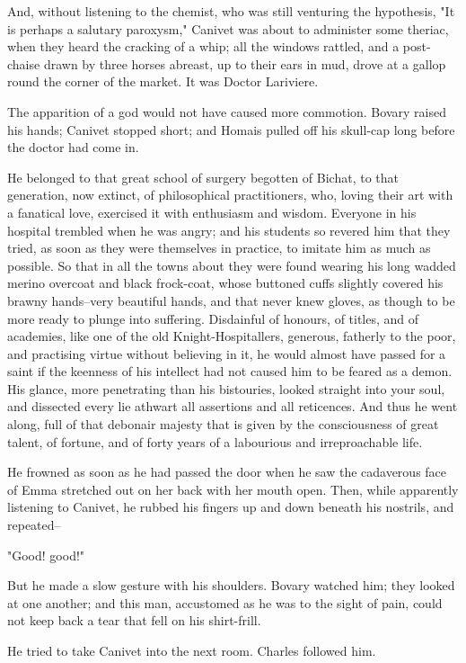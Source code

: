 \documentclass{tufte-book}
\begin{document}
And, without listening to the chemist, who was still venturing the
hypothesis, "It is perhaps a salutary paroxysm," Canivet was about to
administer some theriac, when they heard the cracking of a whip; all the
windows rattled, and a post-chaise drawn by three horses abreast, up to
their ears in mud, drove at a gallop round the corner of the market. It
was Doctor Lariviere.

The apparition of a god would not have caused more commotion. Bovary
raised his hands; Canivet stopped short; and Homais pulled off his
skull-cap long before the doctor had come in.

He belonged to that great school of surgery begotten of Bichat, to that
generation, now extinct, of philosophical practitioners, who, loving
their art with a fanatical love, exercised it with enthusiasm and
wisdom. Everyone in his hospital trembled when he was angry; and his
students so revered him that they tried, as soon as they were themselves
in practice, to imitate him as much as possible. So that in all the
towns about they were found wearing his long wadded merino overcoat
and black frock-coat, whose buttoned cuffs slightly covered his brawny
hands--very beautiful hands, and that never knew gloves, as though to be
more ready to plunge into suffering. Disdainful of honours, of titles,
and of academies, like one of the old Knight-Hospitallers, generous,
fatherly to the poor, and practising virtue without believing in it, he
would almost have passed for a saint if the keenness of his intellect
had not caused him to be feared as a demon. His glance, more penetrating
than his bistouries, looked straight into your soul, and dissected every
lie athwart all assertions and all reticences. And thus he went along,
full of that debonair majesty that is given by the consciousness
of great talent, of fortune, and of forty years of a labourious and
irreproachable life.

He frowned as soon as he had passed the door when he saw the cadaverous
face of Emma stretched out on her back with her mouth open. Then, while
apparently listening to Canivet, he rubbed his fingers up and down
beneath his nostrils, and repeated--

"Good! good!"

But he made a slow gesture with his shoulders. Bovary watched him; they
looked at one another; and this man, accustomed as he was to the sight
of pain, could not keep back a tear that fell on his shirt-frill.

He tried to take Canivet into the next room. Charles followed him.
\end{document}
